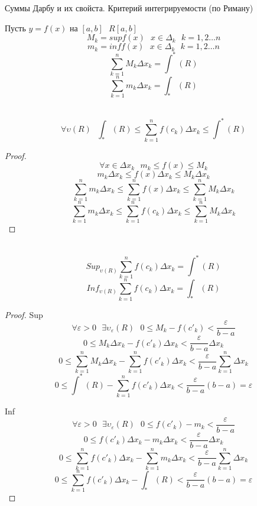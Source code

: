 \begin{title}[\Large]
  Суммы Дарбу и их свойста. Критерий интегрируемости (по Риману)
\end{title}

Пусть $y = f(x)$ на $[a, b] ~~~ R[a, b]$
\[M_k = sup f(x) ~~~ x \in \Delta_k ~~~ k = 1, 2 \ldots n\]
\[m_k = inf f(x) ~~~ x \in \Delta_k ~~~ k = 1, 2 \ldots n\]
\[\sum^{n}_{k = 1}M_k \Delta x_k = \int^* (R)\]
\[\sum^{n}_{k = 1}m_k \Delta x_k = \int_* (R)\]


\\
$$
\forall \upsilon(R) ~~~\int_* (R) \le \sum_{k = 1}^{n} f(c_k) \Delta x_k \le
\int^* (R)
$$
\begin{proof}
  \[\forall x \in \Delta x_k ~~~ m_k \le f(x) \le M_k\]
  \[
     m_k \Delta x_k \le f(x) \Delta x_k \le
     M_k \Delta x_k
  \]
  \[
     \sum_{k = 1}^{n} m_k \Delta x_k \le \sum_{k = 1}^{n} f(x)
     \Delta x_k \le \sum_{k = 1}^{n} M_k \Delta x_k
  \]
  \[
     \sum_{k = 1}^{n} m_k \Delta x_k \le \sum_{k = 1}^{n} f(c_k)
    \Delta x_k \le \sum_{k = 1}^{n} M_k \Delta x_k
  \]
\end{proof}

\\
\[Sup_{\upsilon (R)} \sum_{k = 1}^{n} f(c_k) \Delta x_k = \int^* (R)\]
\[Inf_{\upsilon (R)} \sum_{k = 1}^{n} f(c_k) \Delta x_k = \int_* (R)\]

\begin{proof}
  Sup
  \[
     \forall \varepsilon > 0 ~~~ \exists \upsilon_\varepsilon (R) ~~~ 0 \le
     M_k - f(c'_k) < \frac{\varepsilon}{b - a}
  \]
  \[
     0 \le M_k \Delta x_k - f(c'_k) \Delta x_k <
     \frac{\varepsilon}{b - a}\Delta x_k
  \]
  \[
     0 \le \sum_{k = 1}^{n} M_k \Delta x_k - \sum_{k = 1}^{n} f(c'_k)
     \Delta x_k < \frac{\varepsilon}{b - a} \sum_{k = 1}^{n} \Delta x_k
  \]
  \[
     0 \le \int^* (R) - \sum_{k = 1}^{n} f(c'_k) \Delta x_k <
     \frac{\varepsilon}{b - a} (b - a) = \varepsilon
  \]

  Inf
  \[
     \forall \varepsilon > 0 ~~~ \exists \upsilon_\varepsilon (R) ~~~ 0 \le
      f(c'_k) - m_k < \frac{\varepsilon}{b - a}
  \]
  \[
     0 \le f(c'_k) \Delta x_k - m_k \Delta x_k <
     \frac{\varepsilon}{b - a}\Delta x_k
  \]
  \[
     0 \le \sum_{k = 1}^{n} f(c'_k) \Delta x_k - \sum_{k = 1}^{n} m_k \Delta x_k
     < \frac{\varepsilon}{b - a} \sum_{k = 1}^{n} \Delta x_k
  \]
  \[
     0 \le \sum_{k = 1}^{n} f(c'_k) \Delta x_k - \int_* (R) <
     \frac{\varepsilon}{b - a} (b - a) = \varepsilon
  \]
\end{proof}

